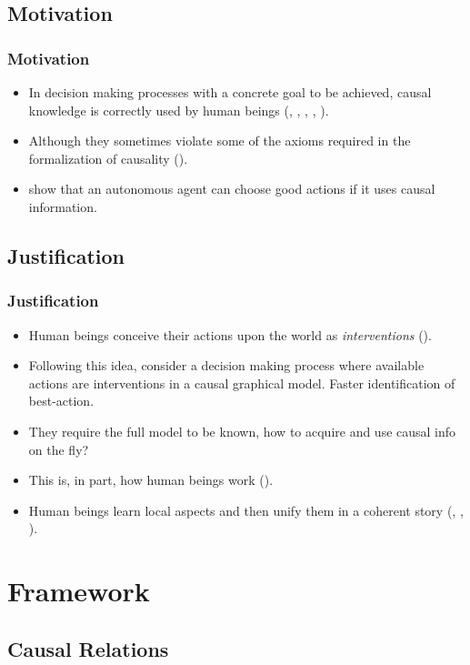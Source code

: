 \documentclass{beamer}
\theoremstyle{plain}
\begin{document}
	\subsection{Motivation} 
	\begin{frame}
	\frametitle{Motivation}
	\begin{itemize}
	\item In decision making processes with a concrete goal to be achieved, causal knowledge is correctly used by human beings (\cite{sloman2006causal}, \cite{nichols2007decision}, \cite{meder2010observing}, \cite{hagmayer2013repeated}, \cite{danks2014unifying}).
	\item Although they sometimes violate some of the axioms required in the formalization of causality (\cite{rottman2014reasoning}).
	\item \cite{lattimoreNIPS2016} show that an autonomous agent can choose good actions if it uses causal information.
	\end{itemize}
	\end{frame}
	\subsection{Justification}
	\begin{frame}
	\frametitle{Justification}
	\begin{itemize}
	\item Human beings conceive their actions upon the world as \textit{interventions} (\cite{hagmayer2009decision}).
	\item Following this idea, \cite{lattimoreNIPS2016} consider a decision making process where available actions are interventions in a causal graphical model. Faster identification of best-action.
	\item They require the full model to be known, how to acquire and use causal info on the fly? 
	\item This is, in part, how human beings work (\cite{hagmayer2013repeated}).
	\item Human beings learn local aspects and then unify them in a coherent story (\cite{fernbach2009causal}, \cite{waldmann2008causal}, \cite{wellen2012learning}).
	\end{itemize}
	\end{frame}
\section{Framework}
	\subsection{Causal Relations}
\end{document}
